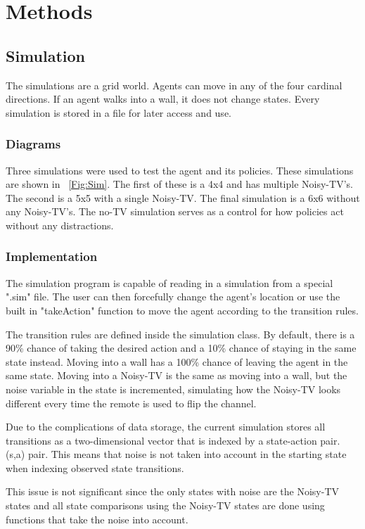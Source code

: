 \documentclass[12pt]{thesis}
\begin{document}
\chapter{Methods}
\section{Simulation}
The simulations are a grid world. Agents can move in any of the four cardinal directions. If an agent walks into a wall, it does not change states. Every simulation is stored in a file for later access and use.
\subsection{Diagrams}
Three simulations were used to test the agent and its policies. These simulations are shown in \figurename~\ref{Fig:Sim}. The first of these is a 4x4 and has multiple Noisy-TV's. The second is a 5x5 with a single Noisy-TV. The final simulation is a 6x6 without any Noisy-TV's. The no-TV simulation serves as a control for how policies act without any distractions.
\subsection{Implementation}
The simulation program is capable of reading in a simulation from a special ".sim" file. The user can then forcefully change the agent's location or use the built in "takeAction" function to move the agent according to the transition rules.

The transition rules are defined inside the simulation class. By default, there is a 90\% chance of taking the desired action and a 10\% chance of staying in the same state instead. Moving into a wall has a 100\% chance of leaving the agent in the same state. Moving into a Noisy-TV is the same as moving into a wall, but the noise variable in the state is incremented, simulating how the Noisy-TV looks different every time the remote is used to flip the channel.

Due to the complications of data storage, the current simulation stores all transitions as a two-dimensional vector that is indexed by a state-action pair. (s,a) pair. This means that noise is not taken into account in the starting state when indexing observed state transitions.

This issue is not significant since the only states with noise are the Noisy-TV states and all state comparisons using the Noisy-TV states are done using functions that take the noise into account.
\end{document}
